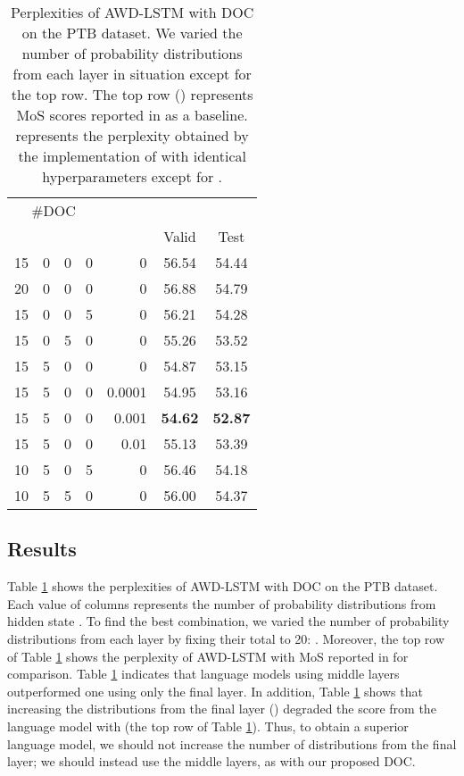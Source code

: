 \documentclass[11pt,a4paper]{article}
\begin{document}
\begin{table}[!t]
  \centering
  \small
  \begin{tabular}{| c c c c | r | c c |} \hline
  \multicolumn{4}{|c|}{\#DOC} & & & \\
   &  &  &  & \multicolumn{1}{c|}{  } & Valid & Test \\ \hline
  15 & 0 & 0 & 0 & 0 & 56.54 & 54.44 \\ \hline
  20 & 0 & 0 & 0 & 0 & 56.88 & 54.79 \\
  15 & 0 & 0 & 5 & 0 & 56.21 & 54.28 \\
  15 & 0 & 5 & 0 & 0 & 55.26 & 53.52 \\
  15 & 5 & 0 & 0 & 0 & 54.87 & 53.15 \\
  15 & 5 & 0 & 0 & 0.0001 & 54.95 & 53.16 \\
  15 & 5 & 0 & 0 & 0.001 & {\bf 54.62} & {\bf 52.87} \\
  15 & 5 & 0 & 0 & 0.01 & 55.13 & 53.39 \\
  10 & 5 & 0 & 5 & 0 & 56.46 & 54.18 \\
  10 & 5 & 5 & 0 & 0 & 56.00 & 54.37 \\ \hline
  \end{tabular}
  \caption{Perplexities of AWD-LSTM with DOC on the PTB dataset. We varied the number of probability distributions from each layer in situation  except for the top row. The top row () represents MoS scores reported in \protect{} as a baseline.  represents the perplexity obtained by the implementation of \protect{}\protect\footnotemark[6] with identical hyperparameters except for . \label{tb:search_doc}}
\end{table}
\addtocounter{footnote}{1}


\subsection{Results}
\label{Sec:lang_result}



Table \ref{tb:search_doc} shows the perplexities of AWD-LSTM with DOC on the PTB dataset.
Each value of columns  represents the number of probability distributions from hidden state .
To find the best combination, we varied the number of probability distributions from each layer by fixing their total to 20: .
Moreover, the top row of Table \ref{tb:search_doc} shows the perplexity of AWD-LSTM with MoS reported in  for comparison.
Table \ref{tb:search_doc} indicates that language models using middle layers outperformed one using only the final layer.
In addition, Table \ref{tb:search_doc} shows that increasing the distributions from the final layer () degraded the score from the language model with  (the top row of Table \ref{tb:search_doc}).
Thus, to obtain a superior language model, we should not increase the number of distributions from the final layer; we should instead use the middle layers, as with our proposed DOC.
\end{document}
